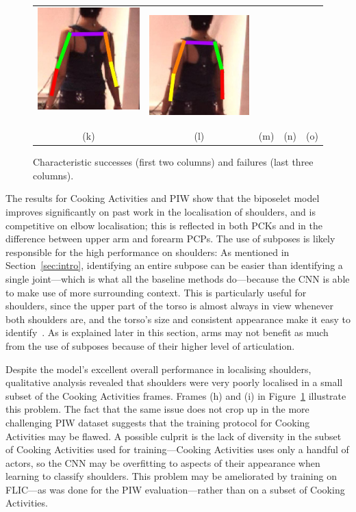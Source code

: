 \documentclass[runningheads]{llncs}
\begin{document}
\begin{figure}[t]
\begin{center}
\begin{tabular}{@{}c@{}c c@{}c@{}c@{}}
\includegraphics[width=0.17\linewidth]{figures/shots-cropped/h36m-s24f12-bad-flip-1.jpg}\,&
\includegraphics[width=0.17\linewidth]{figures/shots-cropped/h36m-s24f14-bad-flip-2.jpg}\\
(k) & (l) & (m) & (n) & (o)
\end{tabular}
\end{center}
\vspace{-6mm}
\caption{Characteristic successes (first two columns) and failures (last three
columns).}
\label{fig:qualitative}
\end{figure}

The results for Cooking Activities and PIW show that the biposelet model
improves significantly on past work in the localisation of shoulders, and is
competitive on elbow localisation; this is reflected in both PCKs and in the
difference between upper arm and forearm PCPs. The use of subposes is likely
responsible for the high performance on shoulders: As mentioned in
Section~\ref{sec:intro}, identifying an entire subpose can be easier than
identifying a single joint---which is what all the baseline methods do---because
the CNN is able to make use of more surrounding context. This is particularly
useful for shoulders, since the upper part of the torso is almost always in view
whenever both shoulders are, and the torso's size and consistent appearance make
it easy to identify~\cite{mori2004recovering}. As is explained later in this
section, arms may not benefit as much from the use of subposes because of their
higher level of articulation.

Despite the model's excellent overall performance in localising shoulders,
qualitative analysis revealed that shoulders were very poorly localised in a
small subset of the Cooking Activities frames. Frames (h) and (i) in
Figure~\ref{fig:qualitative} illustrate this problem. The fact that the same
issue does not crop up in the more challenging PIW dataset suggests that the
training protocol for Cooking Activities may be flawed. A possible culprit is
the lack of diversity in the subset of Cooking Activities used for
training---Cooking Activities uses only a handful of actors, so the CNN may be
overfitting to aspects of their appearance when learning to classify shoulders.
This problem may be ameliorated by training on FLIC---as was done for the PIW
evaluation---rather than on a subset of Cooking Activities.
\end{document}
